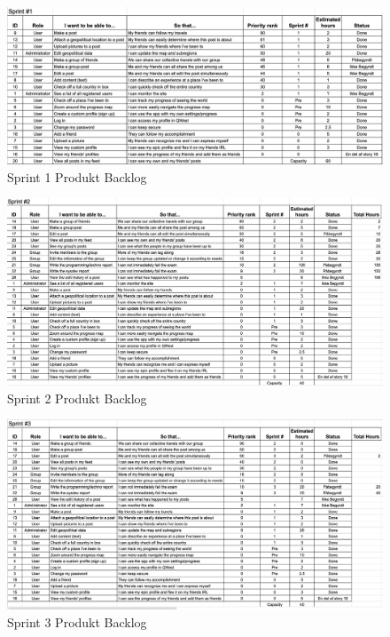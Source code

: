 \begin{figure}
    \includegraphics[width=\linewidth]{figures/Sprint 1 copy.png}
    \caption{{Sprint 1 Produkt Backlog}}
    \label{fig:Sp1PB}
\end{figure}


\begin{figure}
    \includegraphics[width=\linewidth]{figures/Sprint 2 copy.png}
    \caption{{Sprint 2 Produkt Backlog}}
    \label{fig:Sp2PB}
\end{figure}


\begin{figure}
    \includegraphics[width=\linewidth]{figures/Sprint 3 copy.png}
    \caption{{Sprint 3 Produkt Backlog}}
    \label{fig:Sp3PB}
\end{figure}






